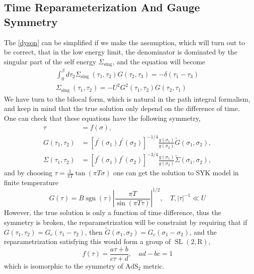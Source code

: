 \documentclass[10pt,openany]{book}
\theoremstyle{thmstyle} %
\theoremstyle{defstyle} %
\theoremstyle{prostyle} %
\begin{document}
\subsection{Time Reparameterization And Gauge Symmetry}
The \eqref{dyson} can be simplified if we make the assumption, which will turn out to be correct, that in the low energy limit, the denominator is dominated by the singular part of the self energy $ \Sigma_{\text{sing}} $, and the equation will become
\begin{equation*}
  \begin{array}{r}
    \int_0^\beta d \tau_2 \Sigma_{\text {sing }}\left(\tau_1, \tau_2\right) G\left(\tau_2, \tau_3\right)=-\delta\left(\tau_1-\tau_3\right) \\
    \Sigma_{\text {sing }}\left(\tau_1, \tau_2\right)=-U^2 G^2\left(\tau_1, \tau_2\right) G\left(\tau_2, \tau_1\right)
    \end{array}
\end{equation*}
\indent We have turn to the bilocal form, which is natural in the path integral formalism, and keep in mind that the true solution only depend on the difference of time. One can check that these equations have the following symmetry,  
\begin{equation*}
  \begin{aligned}
    \tau & =f(\sigma), \\
    G\left(\tau_1, \tau_2\right) & =\left[f^{\prime}\left(\sigma_1\right) f^{\prime}\left(\sigma_2\right)\right]^{-1 / 4} \frac{g\left(\sigma_1\right)}{g\left(\sigma_2\right)} \tilde{G}\left(\sigma_1, \sigma_2\right), \\
    \Sigma\left(\tau_1, \tau_2\right) & =\left[f^{\prime}\left(\sigma_1\right) f^{\prime}\left(\sigma_2\right)\right]^{-3 / 4} \frac{g\left(\sigma_1\right)}{g\left(\sigma_2\right)} \tilde{\Sigma}\left(\sigma_1, \sigma_2\right),
    \end{aligned}
\end{equation*} 
and by choosing $ \tau=\frac{1}{\pi T} \tan (\pi T \sigma) $ one can get the solution to SYK model in finite temperature
\begin{equation*}
  G(\tau)=B \operatorname{sgn}(\tau)\left|\frac{\pi T}{\sin (\pi T \tau)}\right|^{1 / 2}, \quad T,|\tau|^{-1} \ll U
\end{equation*}
\indent However, the true solution is only a function of time difference, thus the symmetry is broken, the reparametrization will be constraint by requiring that if $ G\left(\tau_1, \tau_2\right)=G_c\left(\tau_1-\tau_2\right) $, then $ \tilde{G}\left(\sigma_1, \sigma_2\right)=G_c\left(\sigma_1-\sigma_2\right) $, and the reparametrization satisfying this would form a group of $ \operatorname{SL}(2, \mathrm{R}) $,
\begin{equation*}
  f(\tau)=\frac{a \tau+b}{c \tau+d}, \quad a d-b c=1
\end{equation*}     
which is isomorphic to the symmetry of $ \mathrm{AdS}_2 $ metric.
\end{document}
